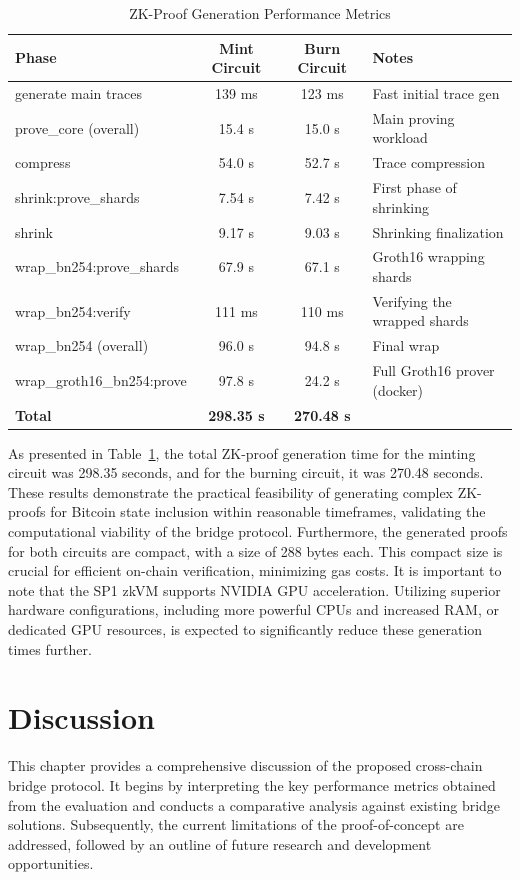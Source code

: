 \documentclass{DESSThesis}
\begin{document}
\begin{table}[h!]
\caption{ZK-Proof Generation Performance Metrics}
\label{tab:zkproof_performance}
\centering
\begin{tabular}{|l|c|c|l|}
\hline
\textbf{Phase} & \textbf{Mint Circuit} & \textbf{Burn Circuit} & \textbf{Notes} \\
\hline
generate main traces & 139 ms & 123 ms & Fast initial trace gen \\
prove\_core (overall) & 15.4 s & 15.0 s & Main proving workload \\
compress & 54.0 s & 52.7 s & Trace compression \\
shrink:prove\_shards & 7.54 s & 7.42 s & First phase of shrinking \\
shrink & 9.17 s & 9.03 s & Shrinking finalization \\
wrap\_bn254:prove\_shards & 67.9 s & 67.1 s & Groth16 wrapping shards \\
wrap\_bn254:verify & 111 ms & 110 ms & Verifying the wrapped shards \\
wrap\_bn254 (overall) & 96.0 s & 94.8 s & Final wrap \\
wrap\_groth16\_bn254:prove & 97.8 s & 24.2 s & Full Groth16 prover (docker) \\
\hline
\textbf{Total} & \textbf{298.35 s} & \textbf{270.48 s} & \\
\hline
\end{tabular}
\end{table}
As presented in Table~\ref{tab:zkproof_performance}, the total ZK-proof generation time for the minting circuit was 298.35 seconds, and for the burning circuit, it was 270.48 seconds. These results demonstrate the practical feasibility of generating complex ZK-proofs for Bitcoin state inclusion within reasonable timeframes, validating the computational viability of the bridge protocol. Furthermore, the generated proofs for both circuits are compact, with a size of 288 bytes each. This compact size is crucial for efficient on-chain verification, minimizing gas costs.
It is important to note that the SP1 zkVM supports NVIDIA GPU acceleration. Utilizing superior hardware configurations, including more powerful CPUs and increased RAM, or dedicated GPU resources, is expected to significantly reduce these generation times further.


\chapter{Discussion} \label{chap:discussion}
This chapter provides a comprehensive discussion of the proposed cross-chain bridge protocol. It begins by interpreting the key performance metrics obtained from the evaluation and conducts a comparative analysis against existing bridge solutions. Subsequently, the current limitations of the proof-of-concept are addressed, followed by an outline of future research and development opportunities.
\end{document}
